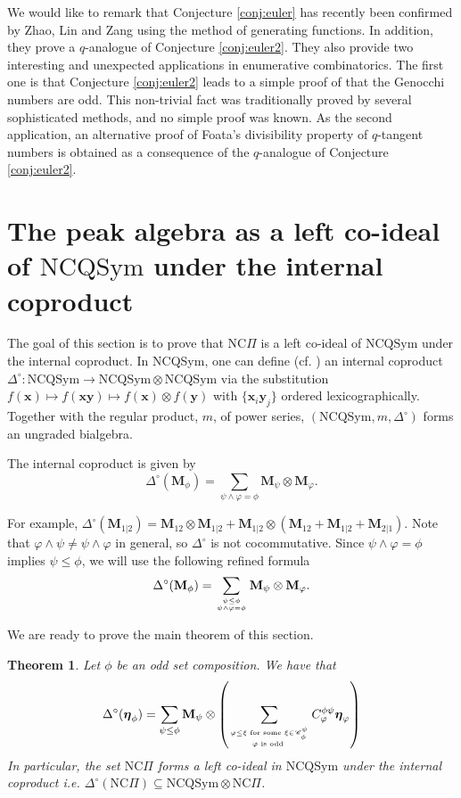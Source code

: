 \documentclass[11pt]{amsart}
\newtheorem{Theorem}{Theorem}[section]
\numberwithin{equation}{section}
\newcommand{\NCQSym}{\mathrm{NCQSym}}
\newcommand{\NCPeak}{\mathrm{NC}\Pi}
\newcommand{\boldeta}{{\boldsymbol{\eta}}}
\begin{document}
We would like to remark that Conjecture \ref{conj:euler} has recently been confirmed by Zhao, Lin and Zang \cite{ZLZ} using the method of generating functions. In addition, they prove a $q$-analogue of Conjecture \ref{conj:euler2}. They also provide two interesting and unexpected applications in enumerative combinatorics. The first one is that Conjecture \ref{conj:euler2} leads to a simple proof of that the Genocchi numbers are odd. This non-trivial fact was traditionally proved by several sophisticated methods, and no simple proof was known. As the second application, an alternative proof of Foata's divisibility property of $q$-tangent numbers is obtained as a consequence of the $q$-analogue of Conjecture \ref{conj:euler2}.




\section{The peak algebra as a left co-ideal of $\NCQSym$ under the internal coproduct}\label{Sec:com}
The goal of this section is to prove that $\NCPeak$ is a left co-ideal of $\NCQSym$ under the internal coproduct. 
In NCQSym, one can define (cf. \cite{BHRZ06}) an internal coproduct $\Delta^\circ:\NCQSym\to\NCQSym\otimes\NCQSym$ via the substitution $f(\mathbf{x})\mapsto f(\mathbf{xy})\mapsto f(\mathbf{x})\otimes f(\mathbf{y})$ with $\{\mathbf{x}_i\mathbf{y}_j\}$ ordered lexicographically. Together with the regular product, $m$, of power series, $(\NCQSym,m,\Delta^\circ)$ forms an ungraded bialgebra. 



The internal coproduct is given by
$$\Delta^\circ(\mathbf{M}_\phi)=\sum_{\psi\land\varphi=\phi}\mathbf{M}_\psi\otimes \mathbf{M}_\varphi.$$

For example, $\Delta^\circ(\mathbf{M}_{1|2})=\mathbf{M}_{12}\otimes\mathbf{M}_{1|2}+\mathbf{M}_{1|2}\otimes(\mathbf{M}_{12}+\mathbf{M}_{1|2}+\mathbf{M}_{2|1})$. Note that $\varphi\land\psi\neq\psi\land\varphi$ in general, so $\Delta^\circ$ is not cocommutative. Since $\psi\land\varphi=\phi$ implies $\psi\leq\phi$, we will use the following refined formula
$$\Delta^\circ(\mathbf{M}_\phi)=\sum_{\psi\leq\phi \atop \psi\land\varphi=\phi}\mathbf{M}_\psi\otimes\mathbf{M}_\varphi.$$

We are ready to prove the main theorem of this section.

\begin{Theorem}\label{thm:internal} Let $\phi$ be an odd set composition. We have that
	$$\Delta^\circ(\boldeta_\phi)=\sum_{\psi\leq\phi}\mathbf{M}_{\psi}\otimes\left(\sum_{\varphi\leq\xi\text{ for some }\xi\in\mathscr{C}_\phi^\psi \atop \varphi\text{ is odd }}C_\varphi^{\phi\psi}\boldeta_\varphi\right)$$
	In particular, the set $\NCPeak$ forms a left co-ideal in $\NCQSym$ under the internal coproduct i.e. $\Delta^{\circ}(\NCPeak)\subseteq\NCQSym\otimes\NCPeak$.
\end{Theorem}
\end{document}
